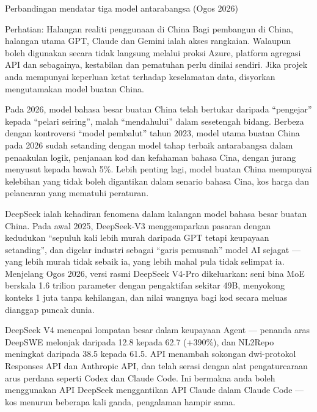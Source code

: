 \begin{center}\small\color{gray}Perbandingan mendatar tiga model antarabangsa (Ogos 2026)\end{center}

\begin{tcbwarn}{Perhatian: Halangan realiti penggunaan di China}
Bagi pembangun di China, halangan utama GPT, Claude dan Gemini ialah akses rangkaian. Walaupun boleh digunakan secara tidak langsung melalui proksi Azure, platform agregasi API dan sebagainya, kestabilan dan pematuhan perlu dinilai sendiri. Jika projek anda mempunyai keperluan ketat terhadap keselamatan data, disyorkan mengutamakan model buatan China.

\end{tcbwarn}


Pada 2026, model bahasa besar buatan China telah bertukar daripada “pengejar” kepada “pelari seiring”, malah “mendahului” dalam sesetengah bidang. Berbeza dengan kontroversi “model pembalut” tahun 2023, model utama buatan China pada 2026 sudah setanding dengan model tahap terbaik antarabangsa dalam penaakulan logik, penjanaan kod dan kefahaman bahasa Cina, dengan jurang menyusut kepada bawah 5\%. Lebih penting lagi, model buatan China mempunyai kelebihan yang tidak boleh digantikan dalam senario bahasa Cina, kos harga dan pelancaran yang mematuhi peraturan.


DeepSeek ialah kehadiran fenomena dalam kalangan model bahasa besar buatan China. Pada awal 2025, DeepSeek-V3 menggemparkan pasaran dengan kedudukan “sepuluh kali lebih murah daripada GPT tetapi keupayaan setanding”, dan digelar industri sebagai “garis pemusnah” model AI sejagat — yang lebih murah tidak sebaik ia, yang lebih mahal pula tidak selimpat ia. Menjelang Ogos 2026, versi rasmi DeepSeek V4-Pro dikeluarkan: seni bina MoE berskala 1.6 trilion parameter dengan pengaktifan sekitar 49B, menyokong konteks 1 juta tanpa kehilangan, dan nilai wangnya bagi kod secara meluas dianggap puncak dunia.

DeepSeek V4 mencapai lompatan besar dalam keupayaan Agent — penanda aras DeepSWE melonjak daripada 12.8 kepada 62.7 (+390\%), dan NL2Repo meningkat daripada 38.5 kepada 61.5. API menambah sokongan dwi-protokol Responses API dan Anthropic API, dan telah serasi dengan alat pengaturcaraan arus perdana seperti Codex dan Claude Code. Ini bermakna anda boleh menggunakan API DeepSeek menggantikan API Claude dalam Claude Code — kos menurun beberapa kali ganda, pengalaman hampir sama.

